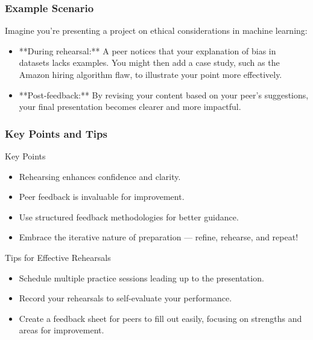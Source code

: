\documentclass[aspectratio=169]{beamer}
\begin{document}
\begin{frame}[fragile]
    \frametitle{Example Scenario}
    Imagine you’re presenting a project on ethical considerations in machine learning:
    \begin{itemize}
        \item **During rehearsal:** A peer notices that your explanation of bias in datasets lacks examples. You might then add a case study, such as the Amazon hiring algorithm flaw, to illustrate your point more effectively.
        
        \item **Post-feedback:** By revising your content based on your peer's suggestions, your final presentation becomes clearer and more impactful.
    \end{itemize}
\end{frame}

\begin{frame}[fragile]
    \frametitle{Key Points and Tips}
    \begin{block}{Key Points}
        \begin{itemize}
            \item Rehearsing enhances confidence and clarity.
            \item Peer feedback is invaluable for improvement.
            \item Use structured feedback methodologies for better guidance.
            \item Embrace the iterative nature of preparation — refine, rehearse, and repeat!
        \end{itemize}
    \end{block}
    \begin{block}{Tips for Effective Rehearsals}
        \begin{itemize}
            \item Schedule multiple practice sessions leading up to the presentation.
            \item Record your rehearsals to self-evaluate your performance.
            \item Create a feedback sheet for peers to fill out easily, focusing on strengths and areas for improvement.
        \end{itemize}
    \end{block}
\end{frame}
\end{document}

